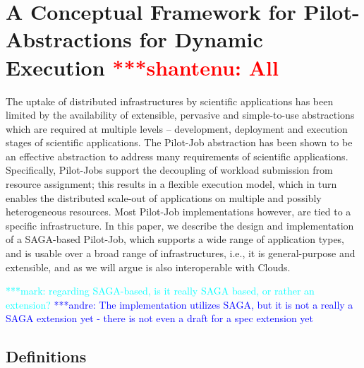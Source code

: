 \documentclass[conference,final]{IEEEtran}
\newcommand{\jhanote}[1]{ {\textcolor{red} { ***shantenu: #1 }}}
\newcommand{\alnote}[1]{ {\textcolor{blue} { ***andre: #1 }}}
\newcommand{\msnote}[1]{ {\textcolor{cyan} { ***mark: #1 }}}
\newcommand{\alnote}[1]{}
\newcommand{\jhanote}[1]{}
\begin{document}

\section{A Conceptual Framework for Pilot-Abstractions for Dynamic
  Execution \jhanote{All}}

The uptake of distributed infrastructures by scientific applications
has been limited by the availability of extensible, pervasive and
simple-to-use abstractions which are required at multiple levels –
development, deployment and execution stages of scientific
applications. The Pilot-Job abstraction has been shown to be an
effective abstraction to address many requirements of scientific
applications. Specifically, Pilot-Jobs support the decoupling of
workload submission from resource assignment; this results in a
flexible execution model, which in turn enables the distributed
scale-out of applications on multiple and possibly heterogeneous
resources. Most Pilot-Job implementations however, are tied to a
specific infrastructure. In this paper, we describe the design and
implementation of a SAGA-based Pilot-Job, which supports a wide range
of application types, and is usable over a broad range of
infrastructures, i.e., it is general-purpose and extensible, and as we
will argue is also interoperable with Clouds.

\msnote{regarding SAGA-based, is it really SAGA based, or rather an
  extension?}\alnote{The implementation utilizes SAGA, but it is not a
  really a SAGA extension yet - there is not even a draft for a spec
  extension yet}



\subsection{Definitions}
\end{document}
